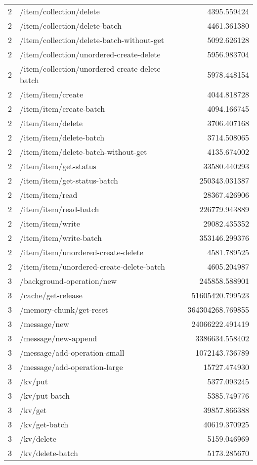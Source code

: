 \begin{longtable}{rlr}
2 & /item/collection/delete & 4395.559424 \\
2 & /item/collection/delete-batch & 4461.361380 \\
2 & /item/collection/delete-batch-without-get & 5092.626128 \\
2 & /item/collection/unordered-create-delete & 5956.983704 \\
2 & /item/collection/unordered-create-delete-batch & 5978.448154 \\
2 & /item/item/create & 4044.818728 \\
2 & /item/item/create-batch & 4094.166745 \\
2 & /item/item/delete & 3706.407168 \\
2 & /item/item/delete-batch & 3714.508065 \\
2 & /item/item/delete-batch-without-get & 4135.674002 \\
2 & /item/item/get-status & 33580.440293 \\
2 & /item/item/get-status-batch & 250343.031387 \\
2 & /item/item/read & 28367.426906 \\
2 & /item/item/read-batch & 226779.943889 \\
2 & /item/item/write & 29082.435352 \\
2 & /item/item/write-batch & 353146.299376 \\
2 & /item/item/unordered-create-delete & 4581.789525 \\
2 & /item/item/unordered-create-delete-batch & 4605.204987 \\
3 & /background-operation/new & 245858.588901 \\
3 & /cache/get-release & 51605420.799523 \\
3 & /memory-chunk/get-reset & 364304268.769855 \\
3 & /message/new & 24066222.491419 \\
3 & /message/new-append & 3386634.558402 \\
3 & /message/add-operation-small & 1072143.736789 \\
3 & /message/add-operation-large & 15727.474930 \\
3 & /kv/put & 5377.093245 \\
3 & /kv/put-batch & 5385.749776 \\
3 & /kv/get & 39857.866388 \\
3 & /kv/get-batch & 40619.370925 \\
3 & /kv/delete & 5159.046969 \\
3 & /kv/delete-batch & 5173.285670 \\

\end{longtable}
